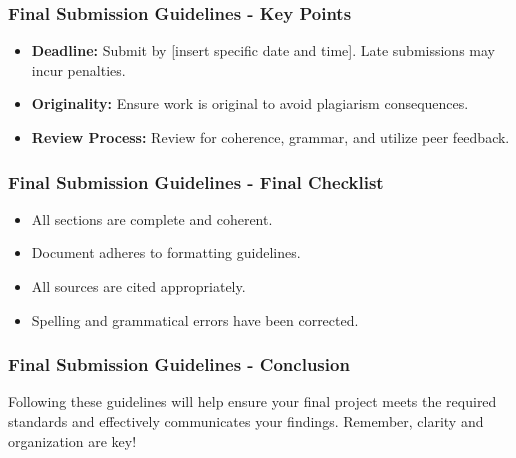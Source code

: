 \documentclass[aspectratio=169]{beamer}
\begin{document}
\begin{frame}[fragile]
  \frametitle{Final Submission Guidelines - Key Points}
  \begin{itemize}
    \item \textbf{Deadline:} Submit by [insert specific date and time]. Late submissions may incur penalties.
    \item \textbf{Originality:} Ensure work is original to avoid plagiarism consequences.
    \item \textbf{Review Process:} Review for coherence, grammar, and utilize peer feedback.
  \end{itemize}
\end{frame}

\begin{frame}[fragile]
  \frametitle{Final Submission Guidelines - Final Checklist}
  \begin{itemize}
    \item [ ] All sections are complete and coherent.
    \item [ ] Document adheres to formatting guidelines.
    \item [ ] All sources are cited appropriately.
    \item [ ] Spelling and grammatical errors have been corrected.
  \end{itemize}
\end{frame}

\begin{frame}[fragile]
  \frametitle{Final Submission Guidelines - Conclusion}
  Following these guidelines will help ensure your final project meets the required standards and effectively communicates your findings. Remember, clarity and organization are key!
\end{frame}
\end{document}
